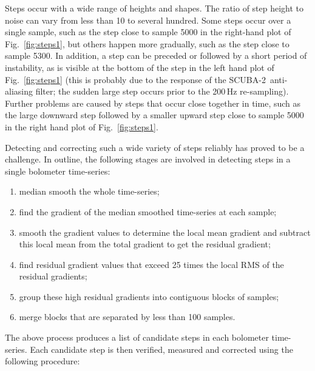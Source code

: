 \documentclass[useAMS,usenatbib,nofootinbib]{mn2e}
\newcommand{\scuba}{SCUBA-2}
\begin{document}
Steps occur with a wide range of heights and shapes. The ratio of step
height to noise can vary from less than 10 to several hundred. Some
steps occur over a single sample, such as the step close to sample
5000 in the right-hand plot of Fig.~\ref{fig:steps1}, but others
happen more gradually, such as the step close to sample 5300. In
addition, a step can be preceded or followed by a short period of
instability, as is visible at the bottom of the step in the left hand
plot of Fig.~\ref{fig:steps1} (this is probably due to the response of
the \scuba\ anti-aliasing filter; the sudden large step occurs prior
to the 200\,Hz re-sampling). Further problems are caused by steps that
occur close together in time, such as the large downward step followed
by a smaller upward step close to sample 5000 in the right hand plot
of Fig.~\ref{fig:steps1}.

Detecting and correcting such a wide variety of steps reliably has
proved to be a challenge. In outline, the following stages are
involved in detecting steps in a single bolometer time-series:

\begin{enumerate}

\item median smooth the whole time-series;

\item find the gradient of the median smoothed time-series at each
sample;

\item smooth the gradient values to determine the local mean gradient
and subtract this local mean from the total gradient to get the
residual gradient;

\item find residual gradient values that exceed 25 times the local RMS
of the residual gradients;

\item group these high residual gradients into contiguous blocks of
samples;

\item merge blocks that are separated by less than 100 samples.
\end{enumerate}

The above process produces a list of candidate steps in each bolometer
time-series. Each candidate step is then verified, measured and corrected
using the following procedure:
\end{document}

